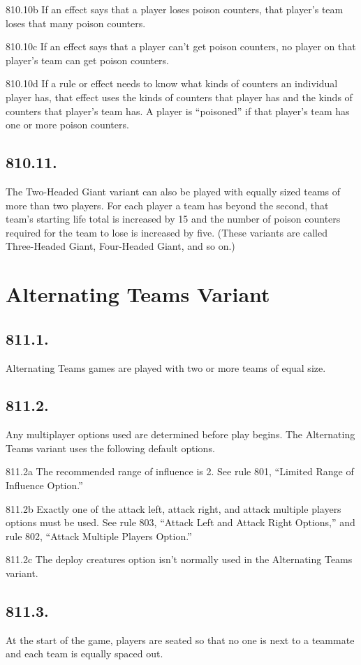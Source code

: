 810.10b If an effect says that a player loses poison counters, that player’s team loses that many poison counters.

810.10c If an effect says that a player can’t get poison counters, no player on that player’s team can get poison counters.

810.10d If a rule or effect needs to know what kinds of counters an individual player has, that effect uses the kinds of counters that player has and the kinds of counters that player’s team has. A player is “poisoned” if that player’s team has one or more poison counters.

\subsection*{810.11.}
The Two-Headed Giant variant can also be played with equally sized teams of more than two players. For each player a team has beyond the second, that team’s starting life total is increased by 15 and the number of poison counters required for the team to lose is increased by five. (These variants are called Three-Headed Giant, Four-Headed Giant, and so on.)

\section{Alternating Teams Variant}
\subsection*{811.1.}
Alternating Teams games are played with two or more teams of equal size.

\subsection*{811.2.}
Any multiplayer options used are determined before play begins. The Alternating Teams variant uses the following default options.

811.2a The recommended range of influence is 2. See rule 801, “Limited Range of Influence Option.”

811.2b Exactly one of the attack left, attack right, and attack multiple players options must be used. See rule 803, “Attack Left and Attack Right Options,” and rule 802, “Attack Multiple Players Option.”

811.2c The deploy creatures option isn’t normally used in the Alternating Teams variant.

\subsection*{811.3.}
At the start of the game, players are seated so that no one is next to a teammate and each team is equally spaced out.

